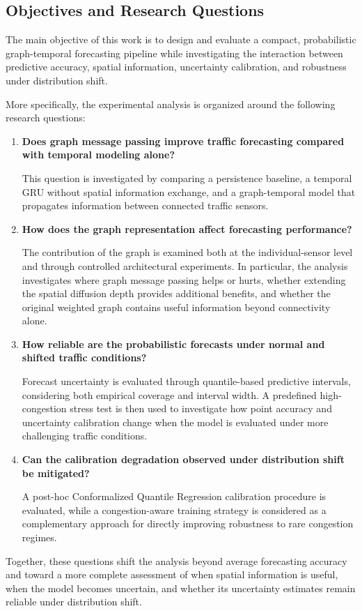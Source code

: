 \subsection{Objectives and Research Questions}
\label{subsec:objectives}

The main objective of this work is to design and evaluate a compact,
probabilistic graph-temporal forecasting pipeline while investigating the
interaction between predictive accuracy, spatial information, uncertainty
calibration, and robustness under distribution shift.

More specifically, the experimental analysis is organized around the
following research questions:

\begin{enumerate}
    \item \textbf{Does graph message passing improve traffic forecasting
    compared with temporal modeling alone?}

    This question is investigated by comparing a persistence baseline, a
    temporal GRU without spatial information exchange, and a graph-temporal
    model that propagates information between connected traffic sensors.

    \item \textbf{How does the graph representation affect forecasting
    performance?}

    The contribution of the graph is examined both at the individual-sensor
    level and through controlled architectural experiments. In particular,
    the analysis investigates where graph message passing helps or hurts,
    whether extending the spatial diffusion depth provides additional
    benefits, and whether the original weighted graph contains useful
    information beyond connectivity alone.

    \item \textbf{How reliable are the probabilistic forecasts under normal
    and shifted traffic conditions?}

    Forecast uncertainty is evaluated through quantile-based predictive
    intervals, considering both empirical coverage and interval width. A
    predefined high-congestion stress test is then used to investigate how
    point accuracy and uncertainty calibration change when the model is
    evaluated under more challenging traffic conditions.

    \item \textbf{Can the calibration degradation observed under
    distribution shift be mitigated?}

    A post-hoc Conformalized Quantile Regression calibration procedure is
    evaluated, while a congestion-aware training strategy is considered as a
    complementary approach for directly improving robustness to rare
    congestion regimes.
\end{enumerate}

Together, these questions shift the analysis beyond average forecasting
accuracy and toward a more complete assessment of when spatial information
is useful, when the model becomes uncertain, and whether its uncertainty
estimates remain reliable under distribution shift.
